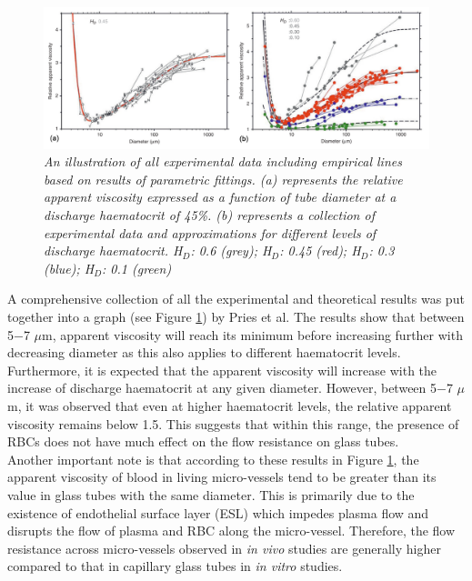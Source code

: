 \begin{figure}[H]
\centering
\includegraphics[width=1\textwidth]{images/ApparentViscosity.png}
\caption{\textit{An illustration of all experimental data including empirical lines based on results of parametric fittings. (a) represents the relative apparent viscosity expressed as a function of tube diameter at a discharge haematocrit of 45\%. (b) represents a collection of experimental data and approximations for different levels of discharge haematocrit. H$_{D}$: 0.6 (grey); H$_{D}$: 0.45 (red); H$_{D}$: 0.3 (blue); H$_{D}$: 0.1 (green)} \label{ApparentViscosity}}
\end{figure}

\noindent A comprehensive collection of all the experimental and theoretical results was put together into a graph (see Figure \ref{ApparentViscosity}) by Pries et al.\cite{Pries1992BloodHematocrit, BloodFlowSecomb} The results show that between 5$-$7 $\mu$m, apparent viscosity will reach its minimum before increasing further with decreasing diameter as this also applies to different haematocrit levels.\cite{Pries1992BloodHematocrit} Furthermore, it is expected that the apparent viscosity will increase with the increase of discharge haematocrit at any given diameter. However, between 5$-$7 $\mu$m, it was observed that even at higher haematocrit levels, the relative apparent viscosity remains below 1.5. This suggests that within this range, the presence of RBCs does not have much effect on the flow resistance on glass tubes. \\


\noindent Another important note is that according to these results in Figure \ref{ApparentViscosity}, the apparent viscosity of blood in living micro-vessels tend to be greater than its value in glass tubes with the same diameter. This is primarily due to the existence of endothelial surface layer (ESL) which impedes plasma flow and disrupts the flow of plasma and RBC along the micro-vessel.\cite{Pries2000TheLayer} Therefore, the flow resistance across micro-vessels observed in \textit{in vivo} studies are generally higher compared to that in capillary glass tubes in \textit{in vitro} studies. 